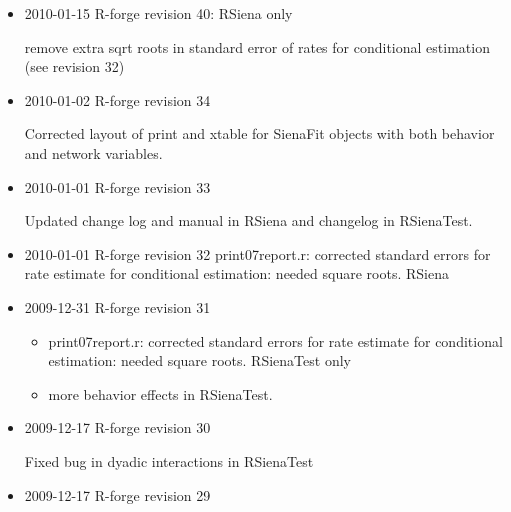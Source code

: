 \documentclass[a4paper,fleqn]{article}
\newcommand{\+}{\, + \,}
\newcommand{\sfn}[1]{\textsf{#1}}
\begin{document}
{\begin{itemize}
\begin{itemize}
\item
   new effect: Popularity Alter, and altered effect1-3 to integers to correct
  bug in fix(myeff)
  \item new utility functions to update effects object
  \item no longer
  necessary to include underlying effects for interactions.
  \item user parameter for number of unspecified behavior interactions
  \item  remove extra sqrt roots in standard error of rates for conditional
  estimation (see revision 31)
\end{itemize}
\item 2010-01-15 R-forge revision 40: RSiena only

  remove extra sqrt roots in standard error of rates for conditional
  estimation (see revision 32)


\item 2010-01-02 R-forge revision 34

  Corrected layout of \sfn{print} and \sfn{xtable} for \sfn{SienaFit} objects
  with both behavior and network variables.

\item 2010-01-01 R-forge revision 33

Updated change log and manual in RSiena and changelog in RSienaTest.

\item 2010-01-01 R-forge revision 32
    print07report.r: corrected standard errors for rate estimate for
    conditional estimation: needed square roots. RSiena

\item 2009-12-31 R-forge revision 31
\begin{itemize}
\item
    print07report.r: corrected standard errors for rate estimate for
    conditional estimation: needed square roots. RSienaTest only

\item more behavior effects in RSienaTest.
\end{itemize}

\item 2009-12-17 R-forge revision 30

Fixed bug in dyadic interactions in RSienaTest

\item 2009-12-17 R-forge revision 29


\end{itemize}}
\end{document}
